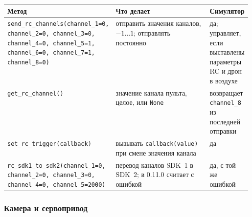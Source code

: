 \begin{center}
\footnotesize
\begin{tabularx}{\linewidth}{@{}>{\raggedright\arraybackslash}p{0.43\linewidth} >{\raggedright\arraybackslash}X >{\raggedright\arraybackslash}p{0.15\linewidth}@{}}
\toprule
\textbf{Метод} & \textbf{Что делает} & \textbf{Симулятор} \\
\midrule
\verb|send_rc_channels(channel_1=0,| \verb|channel_2=0, channel_3=0,| \verb|channel_4=0, channel_5=1,| \verb|channel_6=0, channel_7=1,| \verb|channel_8=0)| & отправить значения каналов, $-1\ldots1$; отправлять постоянно & да; управляет, если выставлены параметры RC и дрон в воздухе \\
\verb|get_rc_channel()| & значение канала пульта, целое, или \verb|None| & возвращает \verb|channel_8| из последней отправки \\
\verb|set_rc_trigger(callback)| & вызывать \verb|callback(value)| при смене значения канала & да \\
\verb|rc_sdk1_to_sdk2(channel_1=0,| \verb|channel_2=0, channel_3=0,| \verb|channel_4=0, channel_5=2000)| & перевод каналов SDK~1 в SDK~2; в 0.11.0 считает с ошибкой & да, с той же ошибкой \\
\bottomrule
\end{tabularx}
\end{center}

\subsubsection*{Камера и сервопривод}

